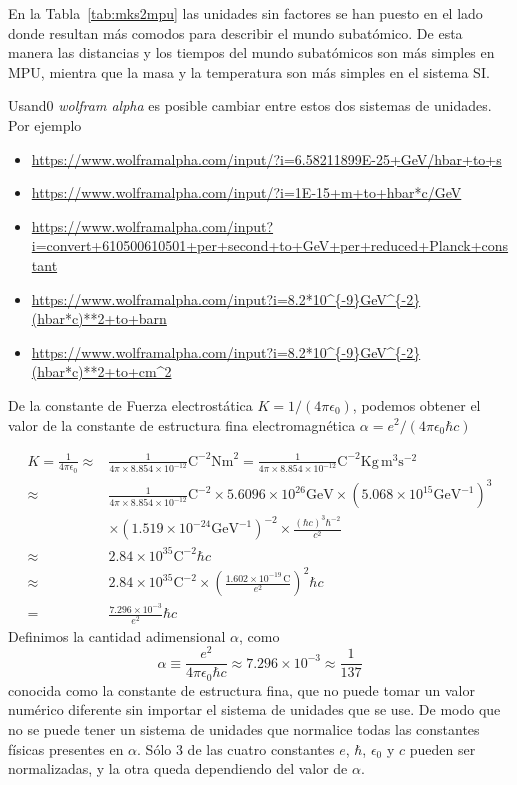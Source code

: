 \begin{frame}
En la Tabla~\ref{tab:mks2mpu} las unidades sin factores se han puesto en el lado donde resultan más comodos para describir el mundo subatómico. De esta manera las distancias y los tiempos del mundo subatómicos son más simples en MPU, mientra que la masa y la temperatura son más simples en el sistema SI.




Usand0 \emph{wolfram alpha}  es posible cambiar entre estos dos sistemas de unidades. Por ejemplo

\begin{itemize}
\item \url{https://www.wolframalpha.com/input/?i=6.58211899E-25+GeV/hbar+to+s}
\item \url{https://www.wolframalpha.com/input/?i=1E-15+m+to+hbar*c/GeV}
\item \url{https://www.wolframalpha.com/input?i=convert+610500610501+per+second+to+GeV+per+reduced+Planck+constant}
\item \url{https://www.wolframalpha.com/input?i=8.2*10^{-9}GeV^{-2}(hbar*c)**2+to+barn}
\item \url{https://www.wolframalpha.com/input?i=8.2*10^{-9}GeV^{-2}(hbar*c)**2+to+cm^2}  
\end{itemize}

De la constante de Fuerza electrostática $K=1/(4\pi\epsilon_0)$, podemos obtener el valor de la constante de estructura fina electromagnética $\alpha=e^2/(4\pi\epsilon_0\hbar c)$

\begin{align*}
  K=\frac{1}{4\pi\epsilon_0}\approx&\frac{1}{4\pi\times8.854\times10^{-12}}\text{C}^{-2}\text{Nm}^2
  =\frac{1}{4\pi\times8.854\times10^{-12}}\text{C}^{-2}\text{Kg}\,\text{m}^3\text{s}^{-2}\\
  \approx&\frac{1}{4\pi\times8.854\times10^{-12}}\text{C}^{-2}\times5.6096\times10^{26}\text{GeV}
  \times(5.068\times10^{15}\text{GeV}^{-1})^3\\
  &\times(1.519\times10^{-24}\text{GeV}^{-1})^{-2}\times\frac{(\hbar c)^3\hbar^{-2}}{c^2}\\
  \approx&2.84\times10^{35}\text{C}^{-2}\hbar c\\
  \approx&2.84\times10^{35}\text{C}^{-2}\times
  \left(
    \frac{1.602\times10^{-19}\,\text{C}}{e^2}
  \right)^2\hbar c\\
  =&\frac{7.296\times10^{-3}}{e^2}\hbar c
\end{align*}
Definimos la cantidad adimensional $\alpha$, como
\begin{equation*}
  \alpha\equiv\frac{e^2}{4\pi\epsilon_0\hbar c}
\approx7.296\times10^{-3}\approx\frac{1}{137}
\end{equation*}
conocida como la constante de estructura fina, que no puede tomar un
valor numérico diferente sin importar el sistema de unidades que se
use. De modo que no se puede tener un sistema de unidades que
normalice todas las constantes físicas presentes en
$\alpha$. Sólo 3 de las cuatro constantes $e$, $\hbar$, $\epsilon_0$
y $c$ pueden ser normalizadas, y la otra queda dependiendo del valor
de $\alpha$.


\end{frame}
